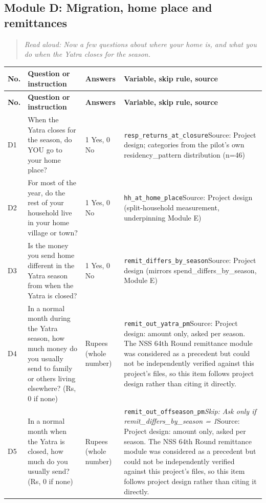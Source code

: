 \documentclass[10pt]{article}
\begin{document}
\subsection*{Module D: Migration, home place and remittances}
\begin{quote}\small\textit{Read aloud: Now a few questions about where your home is, and what you do when the Yatra closes for the season.}\end{quote}
{\scriptsize
\begin{longtable}{p{0.8cm}p{6.4cm}p{3.6cm}p{5.8cm}}
\toprule
\textbf{No.} & \textbf{Question or instruction} & \textbf{Answers} & \textbf{Variable, skip rule, source} \\
\midrule
\endfirsthead
\toprule
\textbf{No.} & \textbf{Question or instruction} & \textbf{Answers} & \textbf{Variable, skip rule, source} \\
\midrule
\endhead
D1 & When the Yatra closes for the season, do YOU go to your home place? & 1 Yes, 0 No & \texttt{resp\_returns\_at\_closure}\newline Source: Project design; categories from the pilot's own residency\_pattern distribution (n=46) \\
D2 & For most of the year, do the rest of your household live in your home village or town? & 1 Yes, 0 No & \texttt{hh\_at\_home\_place}\newline Source: Project design (split-household measurement, underpinning Module E) \\
D3 & Is the money you send home different in the Yatra season from when the Yatra is closed? & 1 Yes, 0 No & \texttt{remit\_differs\_by\_season}\newline Source: Project design (mirrors spend\_differs\_by\_season, Module E) \\
D4 & In a normal month during the Yatra season, how much money do you usually send to family or others living elsewhere? (Rs, 0 if none) & Rupees (whole number) & \texttt{remit\_out\_yatra\_pm}\newline Source: Project design: amount only, asked per season. The NSS 64th Round remittance module was considered as a precedent but could not be independently verified against this project's files, so this item follows project design rather than citing it directly. \\
D5 & In a normal month when the Yatra is closed, how much do you usually send? (Rs, 0 if none) & Rupees (whole number) & \texttt{remit\_out\_offseason\_pm}\newline \textit{Skip: Ask only if remit\_differs\_by\_season = 1}\newline Source: Project design: amount only, asked per season. The NSS 64th Round remittance module was considered as a precedent but could not be independently verified against this project's files, so this item follows project design rather than citing it directly. \\

\end{longtable}}
\end{document}
